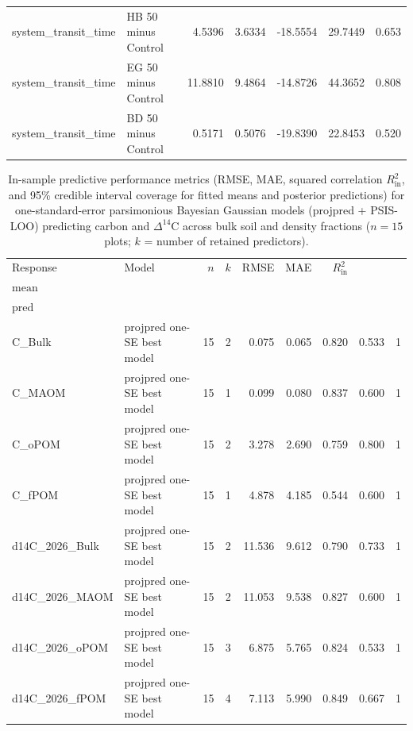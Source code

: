 \documentclass[preprint,12pt]{elsarticle}
\begin{document}
\begin{landscape}
\begin{longtable}{@{} >{\raggedright\arraybackslash}p{3.5cm} >{\raggedright\arraybackslash}p{4.0cm} r r r r r @{} }
system\_\allowbreak{}transit\_\allowbreak{}time & HB 50 minus Control & 4.5396 & 3.6334 & -18.5554 & 29.7449 & 0.653 \\
system\_\allowbreak{}transit\_\allowbreak{}time & EG 50 minus Control & 11.8810 & 9.4864 & -14.8726 & 44.3652 & 0.808 \\
system\_\allowbreak{}transit\_\allowbreak{}time & BD 50 minus Control & 0.5171 & 0.5076 & -19.8390 & 22.8453 & 0.520 \\
\end{longtable}

\newpage

\begin{table}[htbp]
\centering
\caption{In-sample predictive performance metrics (RMSE, MAE, squared correlation $R^2_{\text{in}}$, and 95\% credible interval coverage for fitted means and posterior predictions) for one-standard-error parsimonious Bayesian Gaussian models (projpred + PSIS-LOO) predicting carbon and $\Delta^{14}\text{C}$ across bulk soil and density fractions ($n = 15$ plots; $k$ = number of retained predictors).}
\label{tab:cd14c_mod_perf}
\begingroup
\small
\setlength{\tabcolsep}{5pt}
\renewcommand{\arraystretch}{1.2}
\begin{tabular}{llrrrrrrr}
\toprule
Response & Model & $n$ & $k$ & RMSE & MAE & $R^2_{\text{in}}$ & \makecell[r]{$\text{Cov}_{95,}$\\$\text{mean}$} & \makecell[r]{$\text{Cov}_{95,}$\\$\text{pred}$} \\
\midrule
C\_Bulk & projpred one-SE best model & 15 & 2 & 0.075 & 0.065 & 0.820 & 0.533 & 1 \\
C\_MAOM & projpred one-SE best model & 15 & 1 & 0.099 & 0.080 & 0.837 & 0.600 & 1 \\
C\_oPOM & projpred one-SE best model & 15 & 2 & 3.278 & 2.690 & 0.759 & 0.800 & 1 \\
C\_fPOM & projpred one-SE best model & 15 & 1 & 4.878 & 4.185 & 0.544 & 0.600 & 1 \\
d14C\_2026\_Bulk & projpred one-SE best model & 15 & 2 & 11.536 & 9.612 & 0.790 & 0.733 & 1 \\
d14C\_2026\_MAOM & projpred one-SE best model & 15 & 2 & 11.053 & 9.538 & 0.827 & 0.600 & 1 \\
d14C\_2026\_oPOM & projpred one-SE best model & 15 & 3 & 6.875 & 5.765 & 0.824 & 0.533 & 1 \\
d14C\_2026\_fPOM & projpred one-SE best model & 15 & 4 & 7.113 & 5.990 & 0.849 & 0.667 & 1 \\
\bottomrule
\end{tabular}
\endgroup
\end{table}


\end{landscape}
\end{document}
